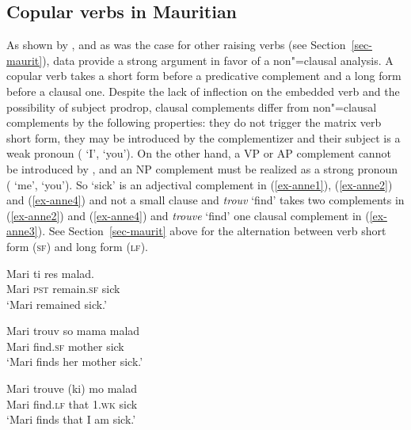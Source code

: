 \subsection{Copular verbs in Mauritian}

As shown by \citet{HenriandLaurens2011}, and as was the case for other raising verbs (see Section~\ref{sec-maurit}),  data
provide a strong argument in favor of a non"=clausal analysis.
A copular verb takes a short form before a
predicative complement and
a long form before a clausal one. Despite the lack of inflection on the embedded verb and the
possibility of subject prodrop, clausal complements differ from non"=clausal complements by the
following properties: they do not trigger the matrix verb short form, they may be introduced by
the complementizer  and their subject is a weak pronoun ( `I',  `you'). On
the other hand, a VP or AP complement cannot be introduced by , and an NP complement must
be realized as a strong pronoun
( `me',  `you'). So  `sick' is an adjectival complement in
(\ref{ex-anne1}), (\ref{ex-anne2}) and (\ref{ex-anne4}) and not a small clause and \emph{trouv} `find' takes
two complements in (\ref{ex-anne2}) and (\ref{ex-anne4}) and \emph{trouve} `find' one clausal complement in (\ref{ex-anne3}). See Section~\ref{sec-maurit}
above for the alternation between verb short form (\textsc{sf}) and long form (\textsc{lf}).

\eal
\ex 
\gll Mari ti res  malad.\\
     Mari \textsc{pst} remain.\textsc{sf} sick\\\hfill\citep[]{HenriandLaurens2011}
\glt `Mari remained sick.' \label{ex-anne1}

\ex 
\gll Mari trouv  so mama malad\\
     Mari find.\textsc{sf} \POSS{} mother sick\\
\glt `Mari finds her mother sick.' \label{ex-anne2}

\ex 
\gll Mari trouve (ki) mo malad\\
     Mari find.\textsc{lf} \hphantom{(}that 1\SG.\textsc{wk} sick\\
\glt `Mari finds that I am sick.' \label{ex-anne3}

